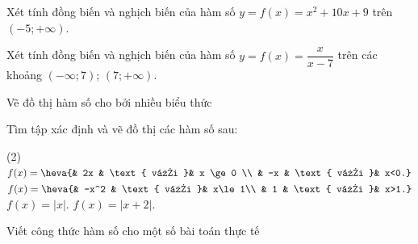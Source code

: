 \begin{vd}
	Xét tính đồng biến và nghịch biến của hàm số $y=f(x)=x^2+10x+9$ trên $(-5;+\infty)$.
\end{vd}
\begin{vd}
	Xét tính đồng biến và nghịch biến của hàm số $y=f(x)=\dfrac{x}{x-7}$ trên các khoảng $(-\infty;7)$;  $(7;+\infty)$.
\end{vd}
\begin{dang}{Vẽ đồ thị hàm số cho bởi nhiều biểu thức}
	
\end{dang}
\begin{vd}
	Tìm tập xác định và vẽ đồ thị các hàm số sau:
	\begin{tasks}(2)
		\task $f(x)=\heva{& 2x & \text{ với }& x \ge 0 \\ & -x & \text{ với }& x<0.}$
		\task $f(x)=\heva{& -x^2 & \text{ với }& x\le 1\\ & 1 & \text{ với }& x>1.}$
		\task $f(x)= \big|x\big|$.
		\task $f(x)= \big|x+2\big|$.
	\end{tasks}
\end{vd}

\begin{dang}{Viết công thức hàm số cho một số bài toán thực tế}
\end{dang}

